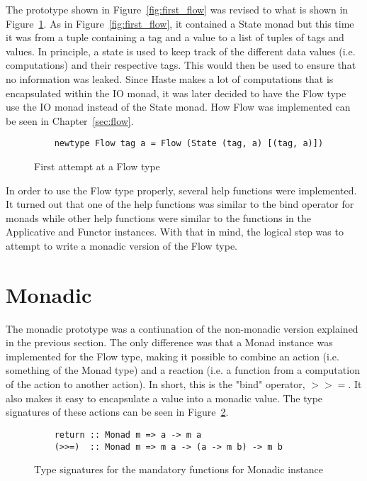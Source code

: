 The prototype shown in Figure~\ref{fig:first_flow} was revised to what is shown in Figure~\ref{fig:second_flow}. As in Figure~\ref{fig:first_flow}, it contained a State monad but this time it was from a tuple containing a tag and a value to a list of tuples of tags and values. In principle, a state is used to keep track of the different data values (i.e. computations) and their respective tags. This would then be used to ensure that no information was leaked. Since Haste makes a lot of computations that is encapsulated within the IO monad, it was later decided to have the Flow type use the IO monad instead of the State monad. How Flow was implemented can be seen in Chapter~\ref{sec:flow}.
\begin{figure}[h]
  \lstset{language=Haskell}
  \begin{lstlisting}
    newtype Flow tag a = Flow (State (tag, a) [(tag, a)])
  \end{lstlisting}
  \caption{First attempt at a Flow type}
  \label{fig:second_flow}
\end{figure}

In order to use the Flow type properly, several help functions were implemented. It turned out that one of the help functions was similar to the bind operator for monads while other help functions were similar to the functions in the Applicative and Functor instances. With that in mind, the logical step was to attempt to write a monadic version of the Flow type.
\section{Monadic}
The monadic prototype was a contiunation of the non-monadic version explained in the previous section. The only difference was that a Monad instance was implemented for the Flow type, making it possible to combine an action (i.e. something of the Monad type) and a reaction (i.e. a function from a computation of the action to another action). In short, this is the "bind" operator, \(>>=\). It also makes it easy to encapsulate a value into a monadic value. The type signatures of these actions can be seen in Figure~\ref{fig:monadic_actions}.
\begin{figure}[h]
  \lstset{language=Haskell}
  \begin{lstlisting}
    return :: Monad m => a -> m a
    (>>=)  :: Monad m => m a -> (a -> m b) -> m b
  \end{lstlisting}
  \caption{Type signatures for the mandatory functions for Monadic instance}
  \label{fig:monadic_actions}
\end{figure}
